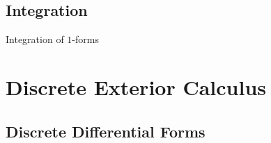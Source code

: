 \subsection{Integration}
Integration of $1$-forms
\section{Discrete Exterior Calculus}

\subsection{Discrete Differential Forms}
